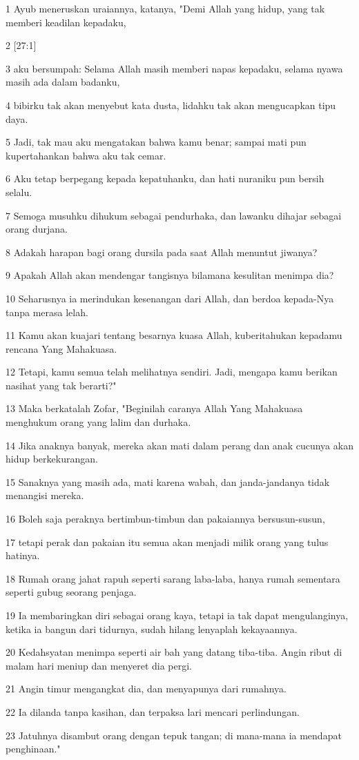 \par 1 Ayub meneruskan uraiannya, katanya, "Demi Allah yang hidup, yang tak memberi keadilan kepadaku,
\par 2 [27:1]
\par 3 aku bersumpah: Selama Allah masih memberi napas kepadaku, selama nyawa masih ada dalam badanku,
\par 4 bibirku tak akan menyebut kata dusta, lidahku tak akan mengucapkan tipu daya.
\par 5 Jadi, tak mau aku mengatakan bahwa kamu benar; sampai mati pun kupertahankan bahwa aku tak cemar.
\par 6 Aku tetap berpegang kepada kepatuhanku, dan hati nuraniku pun bersih selalu.
\par 7 Semoga musuhku dihukum sebagai pendurhaka, dan lawanku dihajar sebagai orang durjana.
\par 8 Adakah harapan bagi orang dursila pada saat Allah menuntut jiwanya?
\par 9 Apakah Allah akan mendengar tangisnya bilamana kesulitan menimpa dia?
\par 10 Seharusnya ia merindukan kesenangan dari Allah, dan berdoa kepada-Nya tanpa merasa lelah.
\par 11 Kamu akan kuajari tentang besarnya kuasa Allah, kuberitahukan kepadamu rencana Yang Mahakuasa.
\par 12 Tetapi, kamu semua telah melihatnya sendiri. Jadi, mengapa kamu berikan nasihat yang tak berarti?"
\par 13 Maka berkatalah Zofar, "Beginilah caranya Allah Yang Mahakuasa menghukum orang yang lalim dan durhaka.
\par 14 Jika anaknya banyak, mereka akan mati dalam perang dan anak cucunya akan hidup berkekurangan.
\par 15 Sanaknya yang masih ada, mati karena wabah, dan janda-jandanya tidak menangisi mereka.
\par 16 Boleh saja peraknya bertimbun-timbun dan pakaiannya bersusun-susun,
\par 17 tetapi perak dan pakaian itu semua akan menjadi milik orang yang tulus hatinya.
\par 18 Rumah orang jahat rapuh seperti sarang laba-laba, hanya rumah sementara seperti gubug seorang penjaga.
\par 19 Ia membaringkan diri sebagai orang kaya, tetapi ia tak dapat mengulanginya, ketika ia bangun dari tidurnya, sudah hilang lenyaplah kekayaannya.
\par 20 Kedahsyatan menimpa seperti air bah yang datang tiba-tiba. Angin ribut di malam hari meniup dan menyeret dia pergi.
\par 21 Angin timur mengangkat dia, dan menyapunya dari rumahnya.
\par 22 Ia dilanda tanpa kasihan, dan terpaksa lari mencari perlindungan.
\par 23 Jatuhnya disambut orang dengan tepuk tangan; di mana-mana ia mendapat penghinaan."

